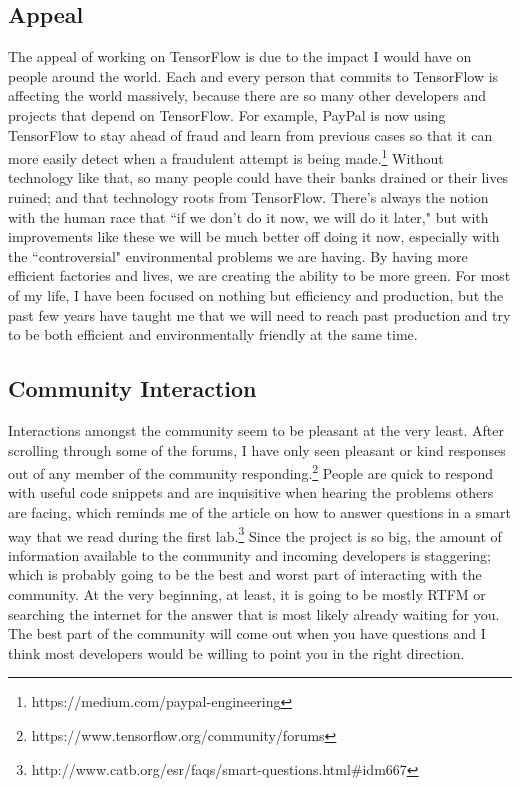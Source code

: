 \documentclass[12pt]{article}
\begin{document}
	\subsection{Appeal}
	
	The appeal of working on TensorFlow is due to the impact I would have on people around the world. Each and every person that commits to TensorFlow is affecting the world massively, because there are so many other developers and projects that depend on TensorFlow. For example, PayPal is now using TensorFlow to stay ahead of fraud and learn from previous cases so that it can more easily detect when a fraudulent attempt is being made.\footnote{https://medium.com/paypal-engineering} Without technology like that, so many people could have their banks drained or their lives ruined; and that technology roots from TensorFlow. There's always the notion with the human race that ``if we don't do it now, we will do it later," but with improvements like these we will be much better off doing it now, especially with the ``controversial" environmental problems we are having. By having more efficient factories and lives, we are creating the ability to be more green. For most of my life, I have been focused on nothing but efficiency and production, but the past few years have taught me that we will need to reach past production and try to be both efficient and environmentally friendly at the same time.
	
	\subsection{Community Interaction}
	
	Interactions amongst the community seem to be pleasant at the very least. After scrolling through some of the forums, I have only seen pleasant or kind responses out of any member of the community responding.\footnote{https://www.tensorflow.org/community/forums} People are quick to respond with useful code snippets and are inquisitive when hearing the problems others are facing, which reminds me of the article on how to answer questions in a smart way that we read during the first lab.\footnote{http://www.catb.org/esr/faqs/smart-questions.html\#idm667} Since the project is so big, the amount of information available to the community and incoming developers is staggering; which is probably going to be the best and worst part of interacting with the community. At the very beginning, at least, it is going to be mostly RTFM or searching the internet for the answer that is most likely already waiting for you. The best part of the community will come out when you have questions and I think most developers would be willing to point you in the right direction.
	
\end{document}
